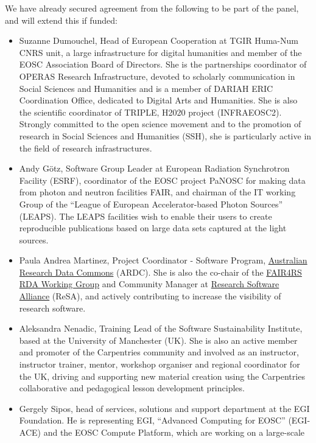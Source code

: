 We have already secured agreement from the following to be part of the panel,
and will extend this if funded:
\begin{itemize}
\item Suzanne Dumouchel, Head of European Cooperation at TGIR Huma-Num CNRS unit, a large infrastructure for
digital humanities and member of the EOSC Association Board of Directors. She is the partnerships coordinator
of OPERAS Research Infrastructure, devoted to scholarly communication in Social Sciences and Humanities and is a member of DARIAH ERIC Coordination Office,
dedicated to Digital Arts and Humanities. She is also the scientific coordinator of TRIPLE, H2020 project
(INFRAEOSC2). Strongly committed to the open science movement and to the promotion of research in Social Sciences
and Humanities (SSH), she is particularly active in the field of research infrastructures.
\item Andy Götz, Software Group Leader at European Radiation Synchrotron
  Facility (ESRF), coordinator of the EOSC project PaNOSC for making data from
  photon and neutron facilities FAIR, and chairman of the IT working Group of
  the ``League of European Accelerator-based Photon Sources'' (LEAPS). The LEAPS
  facilities wish to enable their users to create reproducible publications
  based on large data sets captured at the light sources.
\item Paula Andrea Martinez, Project Coordinator - Software Program, \href{https://ardc.edu.au/}{Australian Research Data Commons} (ARDC).
She is also the co-chair of the \href{https://www.rd-alliance.org/groups/fair-research-software-fair4rs-wg}{FAIR4RS RDA Working Group} and
Community Manager at \href{https://www.researchsoft.org/}{Research Software Alliance} (ReSA), and actively contributing
to increase the visibility of research software.
\item Aleksandra Nenadic, Training Lead of the Software Sustainability Institute,
based at the University of Manchester (UK). She is also an active member and
promoter of the Carpentries community and involved as an instructor,
instructor trainer, mentor, workshop organiser and regional coordinator
for the UK, driving and supporting new material creation using the
Carpentries collaborative and pedagogical lesson development principles.
\item Gergely Sipos, head of services, solutions and support department at the
  EGI Foundation. He is representing EGI, ``Advanced Computing for EOSC''
  (EGI-ACE) and the EOSC Compute Platform, which are working on a large-scale

\end{itemize}
